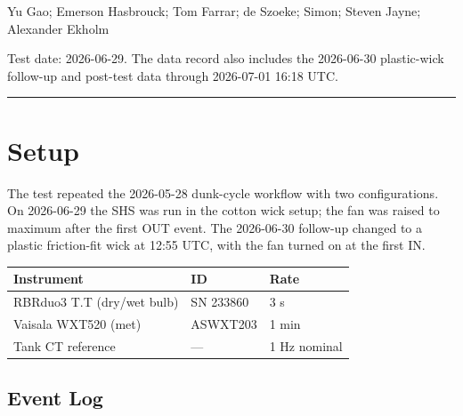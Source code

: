 \documentclass[11pt,letterpaper]{article}
\begin{document}
\vspace{0.4ex}
\vspace{1.0ex}
\noindent Yu Gao; Emerson Hasbrouck; Tom Farrar; de Szoeke; Simon; Steven Jayne; Alexander Ekholm\par
\vspace{0.4ex}
\noindent Test date: 2026-06-29. The data record also includes the 2026-06-30 plastic-wick follow-up and post-test data through 2026-07-01 16:18 UTC.\par
\bigskip\hrule\bigskip

\section{Setup}

The test repeated the 2026-05-28 dunk-cycle workflow with two configurations.
On 2026-06-29 the SHS was run in the cotton wick setup; the fan was raised to
maximum after the first OUT event. The 2026-06-30 follow-up changed to a plastic
friction-fit wick at 12:55 UTC, with the fan turned on at the first IN.

\begin{center}
\begin{tabular}{lll}
\toprule
Instrument & ID & Rate \\
\midrule
RBRduo3 T.T (dry/wet bulb) & SN 233860 & 3 s \\
Vaisala WXT520 (met) & ASWXT203 & 1 min \\
Tank CT reference & --- & 1 Hz nominal \\
\bottomrule
\end{tabular}
\end{center}

\subsection*{Event Log}
\end{document}

